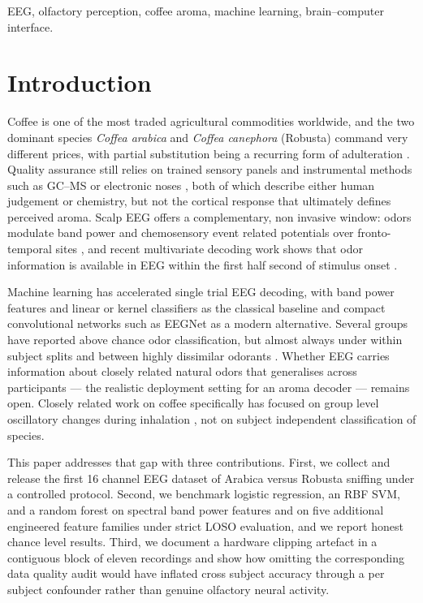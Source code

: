 \documentclass[conference]{IEEEtran}
\begin{document}
\begin{IEEEkeywords}
EEG, olfactory perception, coffee aroma, machine learning, brain--computer interface.
\end{IEEEkeywords}

\section{Introduction}
Coffee is one of the most traded agricultural commodities worldwide, and the two dominant species \textit{Coffea arabica} and \textit{Coffea canephora} (Robusta) command very different prices, with partial substitution being a recurring form of adulteration \cite{ico2023,cardoso2025}. Quality assurance still relies on trained sensory panels and instrumental methods such as GC--MS or electronic noses \cite{bressanello2017,pardo2002}, both of which describe either human judgement or chemistry, but not the cortical response that ultimately defines perceived aroma. Scalp EEG offers a complementary, non invasive window: odors modulate band power and chemosensory event related potentials over fronto-temporal sites \cite{pause2000,kroupi2014}, and recent multivariate decoding work shows that odor information is available in EEG within the first half second of stimulus onset \cite{iravani2022}.

Machine learning has accelerated single trial EEG decoding, with band power features and linear or kernel classifiers as the classical baseline \cite{lotte2018} and compact convolutional networks such as EEGNet \cite{lawhern2018} as a modern alternative. Several groups have reported above chance odor classification, but almost always under within subject splits and between highly dissimilar odorants \cite{kroupi2014,aydemir2017,hou2025}. Whether EEG carries information about closely related natural odors that generalises across participants --- the realistic deployment setting for an aroma decoder --- remains open. Closely related work on coffee specifically has focused on group level oscillatory changes during inhalation \cite{tanaka2024}, not on subject independent classification of species.

This paper addresses that gap with three contributions. First, we collect and release the first 16 channel EEG dataset of Arabica versus Robusta sniffing under a controlled protocol. Second, we benchmark logistic regression, an RBF SVM, and a random forest on spectral band power features and on five additional engineered feature families under strict LOSO evaluation, and we report honest chance level results. Third, we document a hardware clipping artefact in a contiguous block of eleven recordings and show how omitting the corresponding data quality audit would have inflated cross subject accuracy through a per subject confounder rather than genuine olfactory neural activity.
\end{document}
